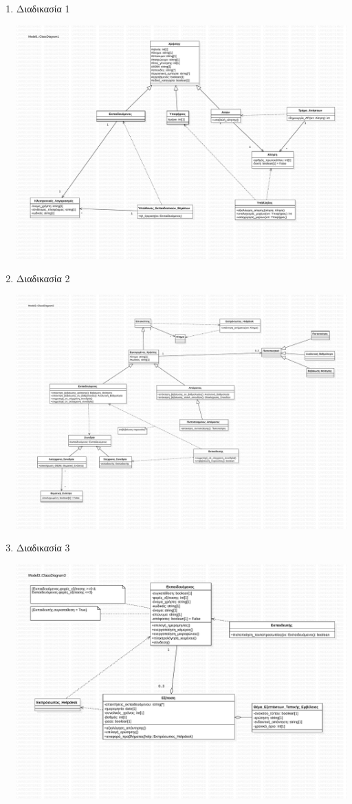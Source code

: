\documentclass[a4paper, titlepage, twoside]{article}
\begin{document}
\begin{enumerate}
\item Διαδικασία 1
\label{sec:orgcc809d2}
\begin{center}
\includegraphics[width=.9\linewidth]{class_1.pdf}
\end{center}
\item Διαδικασία 2
\label{sec:orgc390fbf}
\begin{center}
\includegraphics[width=.9\linewidth]{class_2.pdf}
\end{center}
\item Διαδικασία 3
\label{sec:org77b8c75}
\begin{center}
\includegraphics[width=.9\linewidth]{class_3.pdf}

\end{center}
\end{enumerate}
\end{document}
